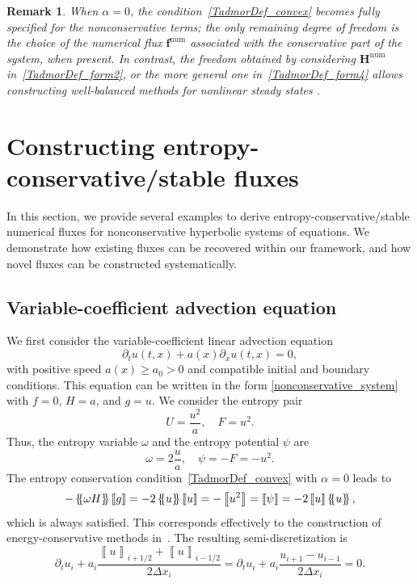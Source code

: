 \documentclass[]{scrartcl}
\newcommand*{\ldblbrace}{\{\mskip-5mu \left \{}
\newcommand*{\rdblbrace}{ \}\mskip-5mu \right \}}
\newcommand{\mean}[1]{\left\ldblbrace #1 \right\rdblbrace}
\renewcommand{\vec}[1]{\boldsymbol{#1}}
\newcommand{\jump}[1]{\left\llbracket #1  \right\rrbracket}
\newtheorem{remark}[theorem]{Remark}
\theoremstyle{definition}
\begin{document}
\begin{remark}
    When $\alpha = 0$, the condition~\eqref{TadmorDef_convex} becomes fully specified for the nonconservative terms; the only remaining degree of freedom is the choice of the numerical flux $\vec{f}^\mathrm{num}$ associated with the conservative part of the system, when present.
    In contrast, the freedom obtained by considering $\vec{H}^\mathrm{num}$ in~\eqref{TadmorDef_form2}, or the more general one in~\eqref{TadmorDef_form4} allows constructing well-balanced methods for nonlinear steady states \cite{WARUSZEWSKI2022111507,artiano2025structurepreservinghighordermethodscompressible}.
\end{remark}

\section{Constructing entropy-conservative/stable fluxes}
\label{sec:numerical_fluxes}
In this section, we provide several examples to derive entropy-conservative/stable numerical fluxes for nonconservative hyperbolic systems of equations.
We demonstrate how existing fluxes can be recovered within our framework, and how novel fluxes can be constructed systematically.

\subsection{Variable-coefficient advection equation}
\label{sec:fluxes_variable_coefficient_advection}
We first consider the variable-coefficient linear advection equation
\begin{equation}
\partial_t u(t,x) + a(x) \partial_x u(t,x) = 0,
\label{eq_adv}
\end{equation}
with positive speed $a(x) \ge a_0 > 0$ and compatible initial and boundary conditions.
This equation can be written in the form \eqref{nonconservative_system} with $f = 0$, $H = a$, and $g = u$.
We consider the entropy pair~\cite{ranocha2018generalised,manzanero2017insights}
\begin{equation}
U = \frac{u^2}{a}, \quad F = u^2.
\end{equation}
Thus, the entropy variable $\omega$ and the entropy potential $\psi$ are
\begin{equation}
\omega = 2\frac{u}{a}, \quad \psi = - F = -u^2.
\end{equation}
The entropy conservation condition~\eqref{TadmorDef_convex} with $\alpha = 0$ leads to
\begin{equation}
     -\mean{\omega H}\jump{g}
    =
    -2 \mean{u}\jump{u}
    =
    - \jump{u^2}
    =
    \jump{\psi} = -2 \jump{u}\mean{u},
\end{equation}
which is always satisfied.
This corresponds effectively to the construction of energy-conservative methods in~\cite{ranocha2018generalised}.
The resulting semi-discretization is
\begin{equation}
\partial_t u_i + a_i \frac{\jump{u}_{i+1/2} + \jump{u}_{i-1/2}}{2 \Delta x_i} = \partial_t u_i + a_i \frac{u_{i+1} - u_{i-1}}{2 \Delta x_i} = 0.
\label{eq_adv_scheme}
\end{equation}
\end{document}
